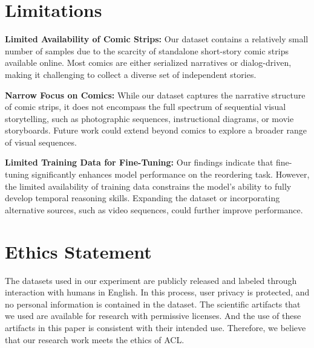 \section*{Limitations}
\label{subsec:limitation} 

\textbf{Limited Availability of Comic Strips:} Our dataset contains a relatively small number of samples due to the scarcity of standalone short-story comic strips available online. Most comics are either serialized narratives or dialog-driven, making it challenging to collect a diverse set of independent stories.

\textbf{Narrow Focus on Comics:} While our dataset captures the narrative structure of comic strips, it does not encompass the full spectrum of sequential visual storytelling, such as photographic sequences, instructional diagrams, or movie storyboards. Future work could extend beyond comics to explore a broader range of visual sequences.

\textbf{Limited Training Data for Fine-Tuning:} Our findings indicate that fine-tuning significantly enhances model performance on the reordering task. However, the limited availability of training data constrains the model’s ability to fully develop temporal reasoning skills. Expanding the dataset or incorporating alternative sources, such as video sequences, could further improve performance.

\section*{Ethics Statement}
\label{subsec:ethics} 
The datasets used in our experiment are publicly released and labeled through interaction with humans in English. In this process, user privacy is protected, and no personal information is contained in the dataset. The scientific artifacts that we used are available for research with permissive licenses. And the use of these artifacts in this paper is consistent with their intended use. Therefore, we believe that our research work meets the ethics of ACL. 